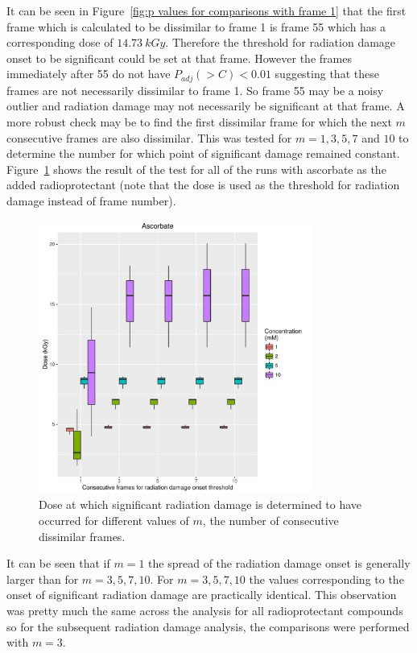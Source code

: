 It can be seen in Figure~\ref{fig:p values for comparisons with frame 1} that the first frame which is calculated to be dissimilar to frame 1 is frame 55 which has a corresponding dose of $14.73\ kGy$.
Therefore the threshold for radiation damage onset to be significant could be set at that frame.
However the frames immediately after 55 do not have $P_{adj}(>C) < 0.01$ suggesting that these frames are not necessarily dissimilar to frame 1.
So frame 55 may be a noisy outlier and radiation damage may not necessarily be significant at that frame.
A more robust check may be to find the first dissimilar frame for which the next $m$ consecutive frames are also dissimilar.
This was tested for $m = 1, 3, 5, 7$ and $10$ to determine the number for which point of significant damage remained constant.
Figure~\ref{fig:Num consecutive frame test} shows the result of the test for all of the runs with ascorbate as the added radioprotectant (note that the dose is used as the threshold for radiation damage instead of frame number).
\begin{figure}
    \centering
    \includegraphics[width=0.8\textwidth]{figures/saxs/Ascorbate_Num_consec_fr_comp.pdf}
    \caption{Dose at which significant radiation damage is determined to have occurred for different values of $m$, the number of consecutive dissimilar frames.}
    \label{fig:Num consecutive frame test}
\end{figure}
It can be seen that if $m=1$ the spread of the radiation damage onset is generally larger than for $m=3, 5, 7, 10$.
For $m=3, 5, 7, 10$ the values corresponding to the onset of significant radiation damage are practically identical.
This observation was pretty much the same across the analysis for all radioprotectant compounds so for the subsequent radiation damage analysis, the comparisons were performed with $m = 3$.

